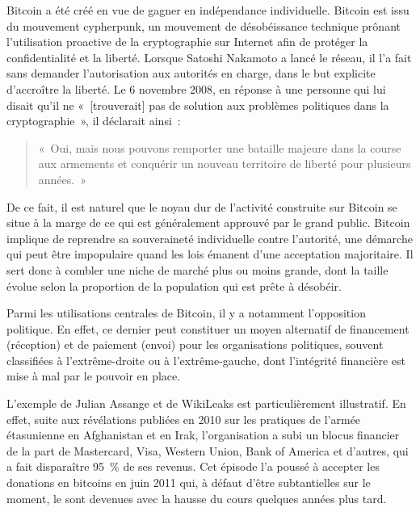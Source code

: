 Bitcoin a été créé en vue de gagner en indépendance individuelle. Bitcoin est issu du mouvement cypherpunk, un mouvement de désobéissance technique prônant l'utilisation proactive de la cryptographie sur Internet afin de protéger la confidentialité et la liberté. Lorsque Satoshi Nakamoto a lancé le réseau, il l'a fait sans demander l'autorisation aux autorités en charge, dans le but explicite d'accroître la liberté. Le 6 novembre 2008, en réponse à une personne qui lui disait qu'il ne «~[trouverait] pas de solution aux problèmes politiques dans la cryptographie~», il déclarait ainsi~:

\begin{quote}
«~Oui, mais nous pouvons remporter une bataille majeure dans la course aux armements et conquérir un nouveau territoire de liberté pour plusieurs années.~»
\end{quote}

De ce fait, il est naturel que le noyau dur de l'activité construite sur Bitcoin se situe à la marge de ce qui est généralement approuvé par le grand public. Bitcoin implique de reprendre sa souveraineté individuelle contre l'autorité, une démarche qui peut être impopulaire quand les lois émanent d'une acceptation majoritaire. Il sert donc à combler une niche de marché plus ou moins grande, dont la taille évolue selon la proportion de la population qui est prête à désobéir.


Parmi les utilisations centrales de Bitcoin, il y a notamment l'opposition politique. En effet, ce dernier peut constituer un moyen alternatif de financement (réception) et de paiement (envoi) pour les organisations politiques, souvent classifiées à l'extrême-droite ou à l'extrême-gauche, dont l'intégrité financière est mise à mal par le pouvoir en place.

L'exemple de Julian Assange et de WikiLeaks est particulièrement illustratif. En effet, suite aux révélations publiées en 2010 sur les pratiques de l'armée étasunienne en Afghanistan et en Irak, l'organisation a subi un blocus financier de la part de Mastercard, Visa, Western Union, Bank of America et d'autres, qui a fait disparaître 95~\% de ses revenus. Cet épisode l'a poussé à accepter les donations en bitcoins en juin 2011 qui, à défaut d'être subtantielles sur le moment, le sont devenues avec la hausse du cours quelques années plus tard.

